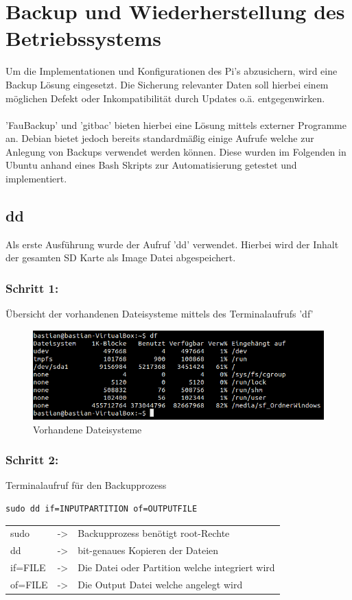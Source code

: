 \section{Backup und Wiederherstellung des Betriebssystems}

Um die Implementationen und Konfigurationen des Pi's abzusichern, wird eine Backup Lösung eingesetzt. Die Sicherung relevanter Daten soll hierbei einem möglichen Defekt oder Inkompatibilität durch Updates o.ä. entgegenwirken.\\
\\
'FauBackup' und 'gitbac' bieten hierbei eine Lösung mittels externer Programme an. Debian bietet jedoch bereits standardmäßig einige Aufrufe welche zur Anlegung von Backups verwendet werden können. Diese wurden im Folgenden in Ubuntu anhand eines Bash Skripts zur Automatisierung getestet und implementiert.

\subsection{dd}
Als erste Ausführung wurde der Aufruf 'dd' verwendet. Hierbei wird der Inhalt der gesamten SD Karte als Image Datei abgespeichert.

\subsubsection*{Schritt 1:}
Übersicht der vorhandenen Dateisysteme mittels des Terminalaufrufs 'df'
\begin{figure}[ht]
\includegraphics[width=\textwidth]{pictures/Bastian/BILD1_df}
\caption{Vorhandene Dateisysteme}
\end{figure}

\subsubsection*{Schritt 2:}
Terminalaufruf für den Backupprozess
\lstset{language=bash,numbers=none,frame=single}
\begin{lstlisting}
sudo dd if=INPUTPARTITION of=OUTPUTFILE
\end{lstlisting}
\begin{tabular}{l c l}
sudo	& -> & Backupprozess benötigt root-Rechte\\
dd	& -> & bit-genaues Kopieren der Dateien\\
if=FILE	& -> & Die Datei oder Partition welche integriert wird\\
of=FILE & -> & Die Output Datei welche angelegt wird\\
\end{tabular}
\newpage %

